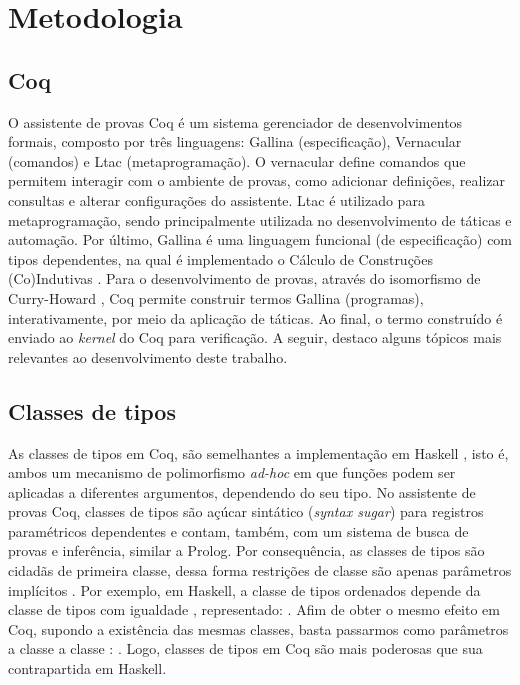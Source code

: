 \chapter{Metodologia}\label{chp:metodologia}

\section{Coq}
O assistente de provas Coq \cite{Coq2021} é um sistema gerenciador de desenvolvimentos formais, composto por três linguagens: Gallina (especificação), Vernacular (comandos) e Ltac (metaprogramação). O vernacular define comandos que permitem interagir com o ambiente de provas, como adicionar definições, realizar consultas e alterar configurações do assistente. Ltac é utilizado para metaprogramação, sendo principalmente utilizada no desenvolvimento de táticas e automação. Por último, Gallina é uma linguagem funcional (de especificação) com tipos dependentes, na qual é implementado o Cálculo de Construções (Co)Indutivas \cite{Coquand1988,Coquand1990,PaulinMohring1993}. Para o desenvolvimento de provas, através do isomorfismo de Curry-Howard \cite{Soerensen2006}, Coq permite construir termos Gallina (programas), interativamente, por meio da aplicação de táticas. Ao final, o termo construído é enviado ao \textit{kernel} do Coq para verificação. A seguir, destaco alguns tópicos mais relevantes ao desenvolvimento deste trabalho.

\section{Classes de tipos}\label{sec:classes}
As classes de tipos em Coq, são semelhantes a implementação em Haskell \cite{Hall1996}, isto é, ambos um mecanismo de polimorfismo \textit{ad-hoc} \cite{Wadler1989} em que funções podem ser aplicadas a diferentes argumentos, dependendo do seu tipo. No assistente de provas Coq, classes de tipos são açúcar sintático (\textit{syntax sugar}) para registros paramétricos dependentes e
contam, também, com um sistema de busca de provas e inferência, similar a Prolog. Por consequência, as classes de tipos são cidadãs de primeira classe, dessa forma restrições de classe são apenas parâmetros implícitos \cite{Sozeau2008}. Por exemplo, em Haskell, a classe de tipos ordenados depende da classe de tipos com igualdade \cite{HaskellOrd}, representado: . Afim de obter o mesmo efeito em Coq, supondo a existência das mesmas classes, basta passarmos como parâmetros a classe  a classe : . Logo, classes de tipos em Coq são mais poderosas que sua contrapartida em Haskell. 

